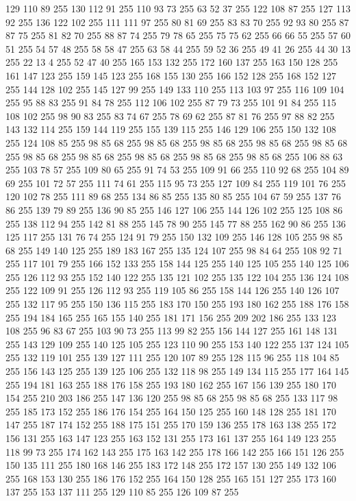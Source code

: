 129 110 89 255 130 112 91 255 110 93 73 255 63 52 37 255 122 108 87 255 127 113 92 255 136 122 102 255 111 111 97 255 80 81 69 255 83 83 70 255 92 93 80 255 87 87 75 255 81 82 70 255 88 87 74 255 79 78 65 255 75 75 62 255 66 66 55 255 57 60 51 255 54 57 48 255 58 58 47 255 63 58 44 255 59 52 36 255 49 41 26 255 44 30 13 255 22 13 4 255 52 47 40 255 165 153 132 255 172 160 137 255 163 150 128 255 161 147 123 255 159 145 123 255 168 155 130 255 166 152 128 255 168 152 127 255 144 128 102 255 145 127 99 255 149 133 110 255 113 103 97 255 116 109 104 255 95 88 83 255 91 84 78 255 112 106 102 255 87 79 73 255 101 91 84 255 115 108 102 255 98 90 83 255 83 74 67 255 78 69 62 255 87 81 76 255 97 88 82 255 143 132 114 255 159 144 119 255 155 139 115 255 146 129 106 255 150 132 108 255 124 108 85 255 98 85 68 255 98 85 68 255 98 85 68 255 98 85 68 255 98 85 68 255 98 85 68 255 98 85 68 255 98 85 68 255
98 85 68 255 98 85 68 255 106 88 63 255 103 78 57 255 109 80 65 255 91 74 53 255 109 91 66 255 110 92 68 255 104 89 69 255 101 72 57 255 111 74 61 255 115 95 73 255 127 109 84 255 119 101 76 255 120 102 78 255 111 89 68 255 134 86 85 255 135 80 85 255 104 67 59 255 137 76 86 255 139 79 89 255 136 90 85 255 146 127 106 255 144 126 102 255 125 108 86 255 138 112 94 255 142 81 88 255 145 78 90 255 145 77 88 255 162 90 86 255 136 125 117 255 131 76 74 255 124 91 79 255 150 132 109 255 146 128 105 255 98 85 68 255 149 140 125 255 189 183 167 255 135 124 107 255 98 84 64 255 108 92 71 255 117 101 79 255 166 152 133 255 158 144 125 255 140 125 105 255 140 125 106 255 126 112 93 255 152 140 122 255 135 121 102 255 135 122 104 255 136 124 108 255 122 109 91 255 126 112 93 255 119 105 86 255 158 144 126 255 140 126 107 255 132 117 95 255 150 136 115 255 183 170 150 255 193 180 162 255 188 176 158 255 194 184 165 255 165 155 140 255 181 171 156 255
209 202 186 255 133 123 108 255 96 83 67 255 103 90 73 255 113 99 82 255 156 144 127 255 161 148 131 255 143 129 109 255 140 125 105 255 123 110 90 255 153 140 122 255 137 124 105 255 132 119 101 255 139 127 111 255 120 107 89 255 128 115 96 255 118 104 85 255 156 143 125 255 139 125 106 255 132 118 98 255 149 134 115 255 177 164 145 255 194 181 163 255 188 176 158 255 193 180 162 255 167 156 139 255 180 170 154 255 210 203 186 255 147 136 120 255 98 85 68 255 98 85 68 255 133 117 98 255 185 173 152 255 186 176 154 255 164 150 125 255 160 148 128 255 181 170 147 255 187 174 152 255 188 175 151 255 170 159 136 255 178 163 138 255 172 156 131 255 163 147 123 255 163 152 131 255 173 161 137 255 164 149 123 255 118 99 73 255 174 162 143 255 175 163 142 255 178 166 142 255 166 151 126 255 150 135 111 255 180 168 146 255 183 172 148 255 172 157 130 255 149 132 106 255 168 153 130 255 186 176 152 255 164 150 128 255 165 151 127 255 173 160 137 255 153 137 111 255 129 110 85 255 126 109 87 255
